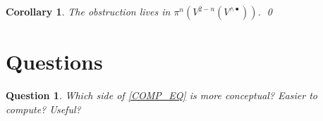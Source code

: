 \documentclass[11pt,reqno
,draft
]{amsart}
\numberwithin{equation}{section}
\numberwithin{figure}{section}
\newtheorem{corollary}[equation]{Corollary}%
\newtheorem{question}[equation]{Question}
\theoremstyle{definition} %
\begin{document}
\begin{corollary}
        The obstruction lives in
        $\pi^n \left( V^{2-n}(V^{\wedge \bullet}) \right)$. \qed
\end{corollary}

\section{Questions}

\begin{question}
        Which side of \cref{COMP_EQ} is more conceptual? Easier to compute? Useful?
\end{question}



{}
 
\end{document}
